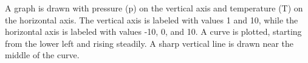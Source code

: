 A graph is drawn with pressure (p) on the vertical axis and temperature (T) on the horizontal axis. The vertical axis is labeled with values 1 and 10, while the horizontal axis is labeled with values -10, 0, and 10. A curve is plotted, starting from the lower left and rising steadily. A sharp vertical line is drawn near the middle of the curve.